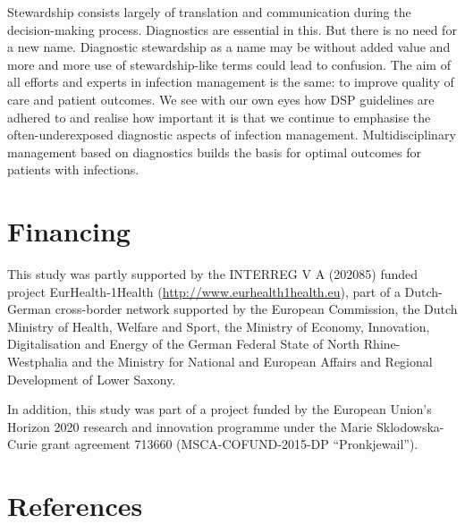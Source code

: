 \documentclass[
]{book}
\begin{document}
Stewardship consists largely of translation and communication during the decision-making process. Diagnostics are essential in this. But there is no need for a new name. Diagnostic stewardship as a name may be without added value and more and more use of stewardship-like terms could lead to confusion. The aim of all efforts and experts in infection management is the same: to improve quality of care and patient outcomes. We see with our own eyes how DSP guidelines are adhered to and realise how important it is that we continue to emphasise the often-underexposed diagnostic aspects of infection management. Multidisciplinary management based on diagnostics builds the basis for optimal outcomes for patients with infections.

\hypertarget{financing}{%
\section*{Financing}\label{financing}}

This study was partly supported by the INTERREG V A (202085) funded project EurHealth-1Health (\url{http://www.eurhealth1health.eu}), part of a Dutch-German cross-border network supported by the European Commission, the Dutch Ministry of Health, Welfare and Sport, the Ministry of Economy, Innovation, Digitalisation and Energy of the German Federal State of North Rhine-Westphalia and the Ministry for National and European Affairs and Regional Development of Lower Saxony.

In addition, this study was part of a project funded by the European Union's Horizon 2020 research and innovation programme under the Marie Sklodowska-Curie grant agreement 713660 (MSCA-COFUND-2015-DP ``Pronkjewail'').

\hypertarget{references-1}{%
\section*{References}\label{references-1}}
\end{document}
